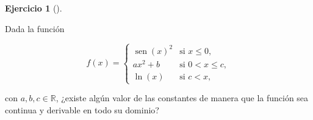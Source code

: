 \documentclass[
  spanish,
  a4paper,
]{scrreport}
\theoremstyle{definition}
\newtheorem{exercise}{Ejercicio}[chapter]
\theoremstyle{remark}
\begin{document}
\begin{exercise}[]\protect\hypertarget{exr-derivabilidad-funcion-trozos-3}{}\label{exr-derivabilidad-funcion-trozos-3}

Dada la función

\[
f(x)=
\begin{cases}
\operatorname{sen}(x)^2 & \mbox{si $x\leq 0$},  \\
ax^2+b &  \mbox{si $0<x\leq c$},  \\
\ln(x) &  \mbox{si $c<x$},
\end{cases}
\]

con \(a,b,c\in\mathbb{R}\), ¿existe algún valor de las constantes de
manera que la función sea continua y derivable en todo su dominio?

\end{exercise}
\end{document}

